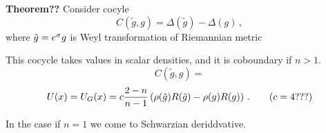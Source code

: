   {\bf Theorem??} 
           Consider cocyle
               $$
   C(\tilde g, g)=\Delta(\tilde g)-\Delta(g)\,,
               $$     
where $\tilde g=e^{{\sigma}}g$ is Weyl transformation of Riemannian metric

This cocycle takes values in scalar densities, and it is coboundary
if $n>1$. 
              $$
        C(\tilde g,g)={}
              $$
 $$
            U(x)=U_{G}(x)=c{2-n\over n-1} \left(
  \rho(\tilde g)R(\tilde g)-\rho(g)R(g)
\right)\,. \qquad (c=4???)
                $$


In the case if $n=1$ we come to Schwarzian deriddvative.

\bye 
